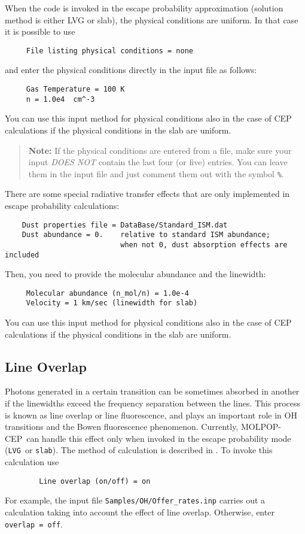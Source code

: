 \documentclass[12pt]{article}
\def\separation {0.5cm}
\def\M{MOLPOP-CEP}
\def\LVG      {\texttt{LVG}}
\def\slab     {\texttt{slab}}
\begin{document}
When the code is invoked in the escape probability approximation (solution
method is either LVG or slab), the physical conditions are uniform. In that
case it is possible to use
%
\smallskip
\begin{verbatim}
     File listing physical conditions = none
\end{verbatim}
and enter the physical conditions directly in the input file as follows:
\vspace{\separation}
\begin{verbatim}
     Gas Temperature = 100 K
     n = 1.0e4  cm^-3
\end{verbatim}
You can use this input method for physical conditions also in the case of CEP
calculations if the physical conditions in the slab are uniform.

\begin{quote}
{\bf Note:} If the physical conditions are entered from a file, make sure your
input {\em DOES NOT} contain the last four (or five) entries. You can leave
them in the input file and just comment them out with the symbol {\tt \%}.
\end{quote}

There are some special radiative transfer effects that are only implemented
in escape probability calculations:
\begin{verbatim}
    Dust properties file = DataBase/Standard_ISM.dat
    Dust abundance = 0.    relative to standard ISM abundance; 
                           when not 0, dust absorption effects are included 
\end{verbatim}

Then, you need to provide the molecular abundance and the linewidth:
\begin{verbatim}
     Molecular abundance (n_mol/n) = 1.0e-4
     Velocity = 1 km/sec (linewidth for slab)
\end{verbatim}
You can use this input method for physical conditions also in the case of CEP
calculations if the physical conditions in the slab are uniform.

\subsection{Line Overlap}
Photons generated in a certain transition can be sometimes absorbed in another
if the linewidths exceed the frequency separation between the lines. This
process is known as line overlap or line fluorescence, and plays an important
role in OH transitions and the Bowen fluorescence phenomenon. Currently, \M\
can handle this effect only when invoked in the escape probability mode (\LVG\
or \slab). The method of calculation is described in \cite{lockett_elitzur89}.
To invoke this calculation use \vspace{\separation}
\begin{verbatim}
        Line overlap (on/off) = on
\end{verbatim}
For example, the input file \texttt{Samples/OH/Offer\_rates.inp} carries out a
calculation taking into account the effect of line overlap. Otherwise, enter
{\tt overlap = off}.
\end{document}
